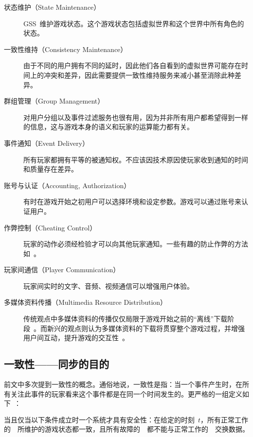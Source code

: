 \begin{description}
\item[状态维护（State Maintenance）]
GSS~维护游戏状态。这个游戏状态包括虚拟世界和这个世界中所有角色的状态。

\item[一致性维持（Consistency Maintenance）]
由于不同的用户拥有不同的延时，因此他们各自看到的虚拟世界可能存在时间上的冲突和差异，因此需要提供一致性维持服务来减小甚至消除此种差异。

\item[群组管理（Group Management）]
对用户分组以及事件过滤服务也很有用，因为并非所有用户都希望得到一样的信息，这与游戏本身的语义和玩家的运算能力都有关。

\item[事件通知（Event Delivery）]
所有玩家都拥有平等的被通知权。不应该因技术原因使玩家收到通知的时间和质量存在差异。

\item[账号与认证（Accounting, Authorization）]
有时在游戏开始之初用户可以选择环境和设定参数。游戏可以通过账号来认证用户。

\item[作弊控制（Cheating Control）]
玩家的动作必须经检验才可以向其他玩家通知。一些有趣的防止作弊的方法如~\cite{Scheating, cheat1, cheat3}。

\item[玩家间通信（Player Communication）]
玩家间实时的文字、音频、视频通信可以增强用户体验。

\item[多媒体资料传播（Multimedia Resource Distribution）]
传统观点中多媒体资料的传播仅仅局限于游戏开始之前的“离线”下载阶段~\cite{traditional}。而新兴的观点则认为多媒体资料的下载将贯穿整个游戏过程，并增强用户间互动，提升游戏的交互性~\cite{modern1, modern3}。
\end{description}



\subsection{一致性——同步的目的}
\label{def}

前文中多次提到一致性的概念。通俗地说，一致性是指：当一个事件产生时，在所有关注此事件的玩家看来这个事件都是在同一个时间发生的。更严格的一组定义如下~\cite{Ferretti2005}：

\begin{zjudefine} [安全性]
当且仅当以下条件成立时一个系统才具有安全性：在给定的时刻~$t$，所有正常工作的~\gss~所维护的游戏状态都一致，且所有故障的~\gss~都不能与正常工作的~\gss~交换数据。
\end{zjudefine}

